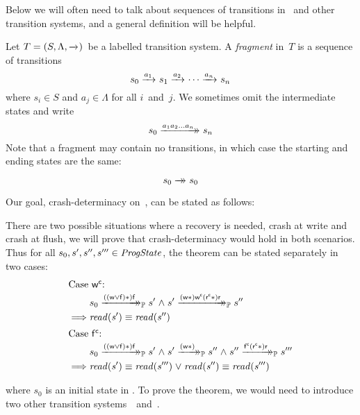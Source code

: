 Below we will often need to talk about sequences of transitions in \Prog\ and other transition systems, and a general definition will be helpful.
\begin{definition}[fragments]\label{def:frag}
Let $T = (S, \Lambda, \xrightarrow{}_{})$~be a labelled transition system.
A \emph{fragment} in~$T$ is a sequence of transitions
$$ s_0 \xrightarrow{a_1}_{} s_1 \xrightarrow{a_2}_{} \cdots \xrightarrow{a_n}_{} s_n $$
where $s_i \in S$ and $a_j \in \Lambda$ for all $i$~and~$j$.
We sometimes omit the intermediate states and write
$$ s_0 \xrightarrow{a_1a_2\ldots a_n}\mathrel{\mkern-14mu}\rightarrow_{} s_n $$
Note that a fragment may contain no transitions, in which case the starting and ending states are the same: 
$$ s_0 \xrightarrow{\vphantom{a_n}}\mathrel{\mkern-14mu}\rightarrow_{} s_0 $$
\end{definition}

Our goal, crash-determinacy on~\Prog, can be stated as follows:
\begin{theorem} \label{theoremP}
	There are two possible situations where a recovery is needed, crash at write and crash at flush, we will prove that crash-determinacy would hold in both scenarios. Thus for all $s_0, s', s'', s''' \in \mathit{ProgState}$, the theorem can be stated separately in two cases:
\begin{align*}
	         \intertext{Case $\actwc$:}
	         &  s_0 \ttsP{\i{((\actw \lor \actf)\ast)} \actf} s' \conj s' \ttsP{\i{(\actw \ast)} \actwc \i{(\actrc\ast)} \actr} s'' \\
	\implies & \i{read(s')} \equiv \i{read(s'')} \\
	         \intertext{Case $\actfc$:}
	         & s_0 \ttsP{\i{((\actw \lor \actf)\ast)} \actf} s' \conj s' \ttsP{\i{(\actw \ast)}} s'' \conj s'' \ttsP{\actfc \i{(\actrc \ast)} \actr} s'''  \\
	\implies & \i{read(s')} \equiv \i{read(s''')} \disj \i{read(s'')} \equiv \i{read(s''')} 
\end{align*}
\end{theorem}
where $s_0$ is an initial state in \Prog.
To prove the theorem, we would need to introduce two other transition systems~\Spec~and~\ProgInv.
